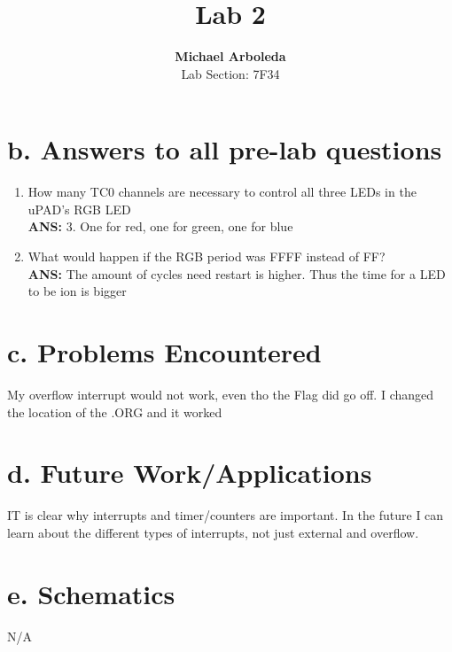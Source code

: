 \documentclass[11pt]{article}
\theoremstyle{plain}
\theoremstyle{definition}
\begin{document}
\captionsetup[figure]{labelfont=bf} 

\title{Lab 2}
\author{\textbf{Michael Arboleda}\\Lab Section: 7F34}
\maketitle
%
%
\section*{b. Answers to all pre-lab questions}
\begin{enumerate}[label={\arabic*)},font={\color{red}\bfseries}]
	\item How many TC0 channels are necessary to control all three LEDs in the uPAD’s RGB LED
	\\[0.8ex]
	\textbf{ANS: } 3. One for red, one for green, one for blue
	\item What would happen if the RGB period was FFFF instead
	of FF?
	\\[0.8ex]
	\textbf{ANS: } The amount of cycles need restart is higher. Thus the time for a LED to be ion is bigger
\end{enumerate}
%
%
\section*{c. Problems Encountered} 
My overflow interrupt would not work, even tho the Flag did go off. I changed the location of the .ORG and it worked 
%
%
\section*{d. Future Work/Applications}
IT is clear why interrupts and timer/counters are important. In the future I can learn about the different types of interrupts, not just external and overflow. 
%
%
\section*{e. Schematics}
N/A
%
%
\newpage
\end{document}
